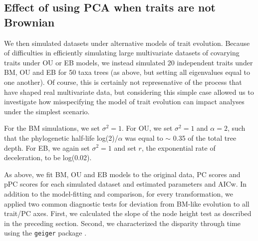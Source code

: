 \documentclass[a4paper,11pt]{article}
\begin{document}
\subsection{Effect of using PCA when traits are not Brownian}
We then simulated datasets under alternative  models of trait evolution. Because of difficulties in efficiently simulating large multivariate datasets of covarying traits under OU or EB models, we instead simulated 20 independent traits under BM, OU and EB for 50 taxa trees (as above, but setting all eigenvalues equal to one another). Of course, this is certainly not represenative of the process that have shaped real multivariate data, but considering this simple case allowed us to investigate how misspecifying the model of trait evolution can impact analyses under the simplest scenario.

For the BM simulations, we set $\sigma^2=\text{1}$. For OU, we set $\sigma^2=\text{1}$ and $\alpha=\text{2}$, such that the phylogenetic half-life log(2)/$\alpha$ \citep{Hansen2008} was equal to $\sim$ 0.35 of the total tree depth. For EB, we again set $\sigma^2=\text{1}$ and set $r$, the exponential rate of deceleration, to be log(0.02). 

As above, we fit BM, OU and EB models to the original data, PC scores and pPC scores for each simulated dataset and estimated parameters and AICw. In addition to the model-fitting and comparison, for every transformation, we applied two common diagnostic tests for deviation from BM-like evolution to all trait/PC axes. First, we calculated the slope of the node height test as described in the preceding section. Second, we characterized the disparity through time \citep{Harmon2003} using the \texttt{geiger} package \citep{geiger2}. 
\end{document}
